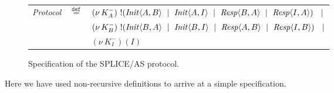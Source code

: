 \documentclass[10pt,a4paper,final,oneside,fleqn]{book}
\newcommand*{\eqdef}{\mathbin{\mathop{=}\limits^{\texttt{def}}}}
\begin{document}
\begin{figure}[!bht]
\begin{center}
\begin{tabular}{|lll|}
{\itshape Protocol\/}&$\eqdef$&$(\nu~\!K^-_{A})~!(\mbox{{\itshape Init\/}}\langle A,B\rangle~\mid~\mbox{{\itshape Init\/}}\langle A,I\rangle~\mid~\mbox{{\itshape Resp\/}}\langle B,A\rangle~\mid~\mbox{{\itshape Resp\/}}\langle I,A\rangle)~~\mid$\\
&&$(\nu~\!K^-_{B})~!(\mbox{{\itshape Init\/}}\langle B,A\rangle~\mid~\mbox{{\itshape Init\/}}\langle B,I\rangle~\mid~\mbox{{\itshape Resp\/}}\langle A,B\rangle~\mid~\mbox{{\itshape Resp\/}}\langle I,B\rangle)~~\mid$\\
&&$(\nu~\!K^-_I)(I)$\\
\hline
\end{tabular}
\end{center}
\caption{Specification of the SPLICE/AS protocol.\label{splice}}
\end{figure}
Here we have used non-recursive definitions to arrive at a simple specification.
\end{document}

